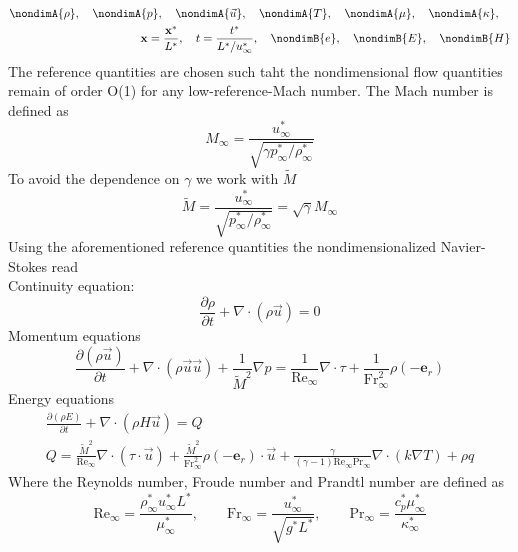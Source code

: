 	\begin{align}
	\nondimA{\rho},\quad
	\nondimA{p},\quad
	\nondimA{\vec{u}},\quad
	\nondimA{T},\quad
	\nondimA{\mu},\quad
	\nondimA{\kappa},\quad \\
	\mathbf{x} = \frac{\mathbf{x}^*}{L^*},\quad
	t = \frac{t^*}{L^*/u^*_\infty},\quad
	\nondimB{e},\quad
	\nondimB{E},\quad
	\nondimB{H}
	\end{align}
	The reference quantities are chosen such taht the nondimensional flow quantities remain of order O(1) for any low-reference-Mach number. The Mach number is defined as
	\begin{equation}
	M_\infty = \frac{u^*_\infty}{\sqrt{\gamma p^*_\infty/\rho^*_\infty}}
	\end{equation}
	To avoid the dependence on $\gamma$ we work with $\tilde{M}$ 
	\begin{equation}
	\tilde{M} = \frac{u^*_\infty}{\sqrt{p^*_\infty/\rho^*_\infty}} = \sqrt{\gamma}M_\infty
	\end{equation}
	Using the aforementioned reference quantities the nondimensionalized Navier-Stokes read\\
	Continuity equation:
	\begin{equation}
	\frac{\partial \rho}{\partial t} + \nabla \cdot (\rho \vec{u}) = 0
	\end{equation}
	Momentum equations
	\begin{equation}
	\frac{\partial (\rho \vec{u})}{\partial t} + \nabla   \cdot (\rho \vec{u} \vec{u} ) + \frac{1}{\tilde{M}^2}\nabla p  = \frac{1}{\text{Re}_\infty}\nabla  \cdot \tau  + \frac{1}{\text{Fr}_\infty^2}\rho (-\mathbf{e}_r)
	\end{equation}
	Energy equations
	\begin{gather}
	\frac{\partial (\rho E)}{\partial t} + \nabla   \cdot (\rho H \vec{u} )   = Q \\
	Q  =\frac{\tilde{M}^2}{\text{Re}_\infty} \nabla  \cdot (\tau \cdot\vec{u} ) + 
	\frac{\tilde{M}^2}{\text{Fr}_\infty^2}\rho (-\mathbf{e}_r) \cdot \vec{u}  + 
	\frac{\gamma}{(\gamma-1)\text{Re}_\infty\text{Pr}_\infty}\nabla \cdot (k \nabla T )+
	\rho q 
	\end{gather}
	Where the Reynolds number, Froude number and Prandtl number are defined as
	\begin{equation}
	\text{Re}_\infty = \frac{\rho^*_\infty u^*_\infty L^*}{\mu^*_\infty}, \qquad \text{Fr}_\infty = \frac{u^*_\infty}{\sqrt{g^*L^*}}, \qquad \text{Pr}_\infty = \frac{c_p^* \mu^*_\infty}{\kappa^*_\infty}
	\end{equation}
	
